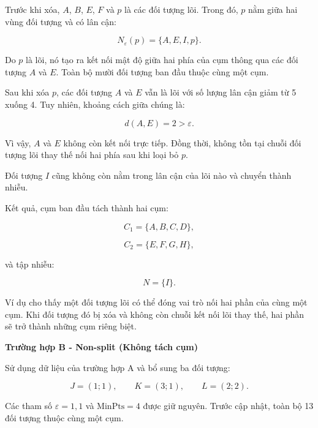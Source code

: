 Trước khi xóa, \(A\), \(B\), \(E\), \(F\) và \(p\) là các đối tượng lõi. Trong đó, \(p\) nằm giữa hai vùng đối tượng và có lân cận:

\begin{equation}
    N_{\varepsilon}(p)=\{A,E,I,p\}.
\end{equation}

Do \(p\) là lõi, nó tạo ra kết nối mật độ giữa hai phía của cụm thông qua các đối tượng \(A\) và \(E\). Toàn bộ mười đối tượng ban đầu thuộc cùng một cụm.

Sau khi xóa \(p\), các đối tượng \(A\) và \(E\) vẫn là lõi với số lượng lân cận giảm từ 5 xuống 4. Tuy nhiên, khoảng cách giữa chúng là:

\begin{equation}
    d(A,E)=2>\varepsilon.
\end{equation}

Vì vậy, \(A\) và \(E\) không còn kết nối trực tiếp. Đồng thời, không tồn tại chuỗi đối tượng lõi thay thế nối hai phía sau khi loại bỏ \(p\).

Đối tượng \(I\) cũng không còn nằm trong lân cận của lõi nào và chuyển thành nhiễu.

Kết quả, cụm ban đầu tách thành hai cụm:

\begin{equation}
    C_1=\{A,B,C,D\},
\end{equation}

\begin{equation}
    C_2=\{E,F,G,H\},
\end{equation}

và tập nhiễu:

\begin{equation}
    N =\{I\}.
\end{equation}

Ví dụ cho thấy một đối tượng lõi có thể đóng vai trò nối hai phần của cùng một cụm. Khi đối tượng đó bị xóa và không còn chuỗi kết nối lõi thay thế, hai phần sẽ trở thành những cụm riêng biệt.

\textbf{Trường hợp B - Non-split (Không tách cụm)}

Sử dụng dữ liệu của trường hợp A và bổ sung ba đối tượng:

\begin{equation}
    J=(1;1),\qquad K=(3;1),\qquad L=(2;2).
\end{equation}

Các tham số \(\varepsilon=1{,}1\) và \(\mathrm{MinPts}=4\) được giữ nguyên. Trước cập nhật, toàn bộ 13 đối tượng thuộc cùng một cụm.

